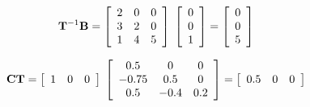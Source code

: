\[
{\bf{T}}^{ - 1} {\bf{B}} = \left[ {\begin{array}{*{20}c}
   2 & 0 & 0  \\
   3 & 2 & 0  \\
   1 & 4 & 5  \\
\end{array}} \right]\;\left[ {\begin{array}{*{20}c}
   0  \\
   0  \\
   1  \\
\end{array}} \right] = \left[ {\begin{array}{*{20}c}
   0  \\
   0  \\
   5  \\
\end{array}} \right]
\]

\[
{\bf{CT}} = \left[ {\begin{array}{*{20}c}
   1 & 0 & 0  \\
\end{array}} \right]\;\left[ {\begin{array}{*{20}c}
   {0.5} & 0 & 0  \\
   { - 0.75} & {0.5} & 0  \\
   {0.5} & { - 0.4} & {0.2}  \\
\end{array}} \right] = \left[ {\begin{array}{*{20}c}
   {0.5} & 0 & 0  \\
\end{array}} \right]
\]

